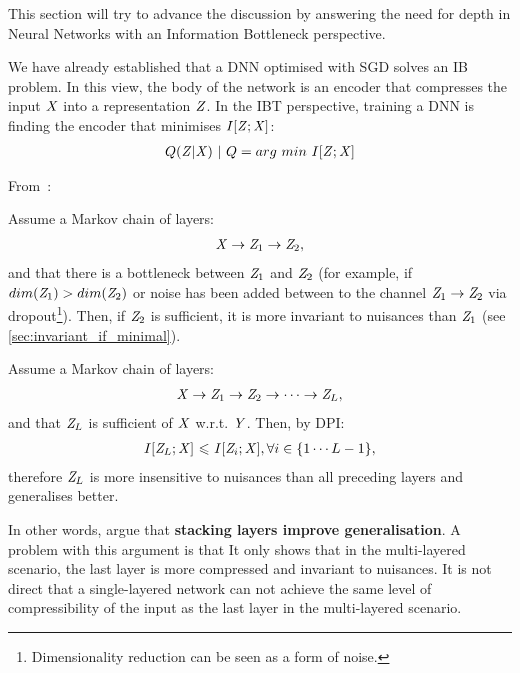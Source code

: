 This section will try to advance the discussion by answering the need for depth in Neural Networks with an Information Bottleneck perspective.

We have already established that a DNN optimised with SGD solves an \ac{IB} problem. In this view, the body of the network is an encoder that compresses the input ${\mathit{X}}$ into a representation ${\mathit{Z}}$. In the IBT perspective, training  a DNN is finding the encoder that minimises $I[{{\mathit{Z}}};{{\mathit{X}}}]$:
\begin{align*}
	Q({\mathit{Z}}|{\mathit{X}})~|~Q = arg\ min\ I[{{\mathit{Z}}};{{\mathit{X}}}]
\end{align*}

From~\cite{achille:2017emergence}:
\begin{corollary} Assume a Markov chain of layers:
	\begin{align*}
		{\mathit{X}} \to {\mathit{Z}}_1 \to {\mathit{Z}}_2,
	\end{align*}
and that there is a bottleneck between ${\mathit{Z}}_1$ and ${\mathit{Z}}_2$ (for example, if $dim({\mathit{Z}}_1)>dim({\mathit{Z}}_2)$ or noise has been added between to the channel ${\mathit{Z}}_1 \to {\mathit{Z}}_2$ via dropout\footnote{Dimensionality reduction can be seen as a form of noise.}). Then, if ${\mathit{Z}}_2$ is sufficient, it is more invariant to nuisances than ${\mathit{Z}}_1$ (see \cref{sec:invariant_if_minimal}).
\end{corollary}

\begin{corollary} Assume a Markov chain of layers:
	\begin{align*}
		{\mathit{X}} \to {\mathit{Z}}_1 \to {\mathit{Z}}_2 \to \cdots \to {\mathit{Z}}_L,
	\end{align*}\label{cor:stacking_layers}
	and that ${\mathit{Z}}_L$ is sufficient of ${\mathit{X}}$ w.r.t. ${\mathit{Y}}$. Then, by \ac{DPI}:
	\begin{align*}
		I[{\mathit{Z}}_L;{\mathit{X}}] {~\leqslant ~} I[{\mathit{Z}}_i;{\mathit{X}}], \forall i \in \{1 \cdots L-1\},
	\end{align*}
	therefore ${\mathit{Z}}_L$ is more insensitive to nuisances than all preceding layers and generalises better.
\end{corollary}

In other words, \citeauthor{achille:2017emergence} argue  that \textbf{stacking layers improve generalisation}.
A problem with this argument is that It only shows that in the multi-layered scenario, the last layer is more compressed and invariant to nuisances. It is not direct that a single-layered network can not achieve the same level of compressibility of the input as the last layer in the multi-layered scenario.

